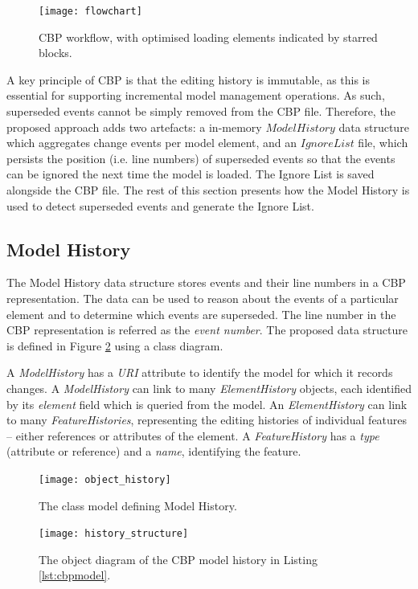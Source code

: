 \begin{figure}[ht]
\centering
\texttt{[image: flowchart]}
\caption{CBP workflow, with optimised loading elements indicated by starred blocks.}
\label{fig:flowchart}
\end{figure}

A key principle of CBP is that the editing history is immutable, as this is essential for supporting incremental model management operations. As such, superseded events cannot be simply removed from the CBP file. Therefore, the proposed approach adds two artefacts: a in-memory $Model History$ data structure which aggregates change events per model element, and an $Ignore List$ file, which persists the position (i.e. line numbers) of superseded events so that the events can be ignored the next time the model is loaded. The Ignore List is saved alongside the CBP file. The rest of this section presents how the Model History is used to detect superseded events and generate the Ignore List.

\subsection{Model History}
\label{subsec:model_history}
The Model History data structure stores events and their line numbers in a CBP representation.  The data can be used to reason about the events of a particular element and to determine which events are superseded. The line number in the CBP representation is referred as the \emph{event number}. The proposed data structure is defined in Figure \ref{fig:object_history} using a class diagram.  

A \emph{ModelHistory} has a \emph{URI} attribute to identify the model for which it records changes.  A \emph{ModelHistory} can link to many \emph{ElementHistory} objects, each identified by its \emph{element} field which is queried from the model. An \emph{ElementHistory} can link to many \emph{FeatureHistories}, representing the editing histories of individual features -- either references or attributes of the element. A \emph{FeatureHistory} has a \emph{type} (attribute or reference) and a \emph{name}, identifying the feature.

\begin{figure}[ht]
\centering
\texttt{[image: object\_history]}
\caption{The class model defining Model History.}
\label{fig:object_history}
\end{figure}

\begin{figure}[ht]
\centering
\texttt{[image: history\_structure]}
\caption{The object diagram of the CBP model history in Listing \ref{lst:cbpmodel}.}
\label{fig:history_structure}
\end{figure}

